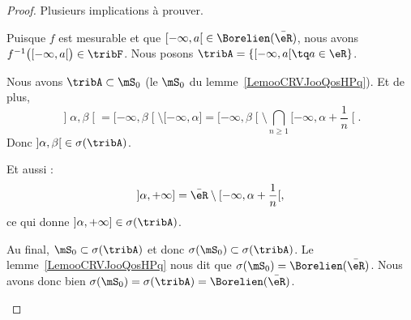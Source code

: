 \begin{proof}
	Plusieurs implications à prouver.
	\begin{subproof}
		\spitem[\ref{ITEMooHAMHooYLqUhVi}\( \Rightarrow\)\ref{ITEMooHAMHooYLqUhVii}]
		Puisque \( f\) est mesurable et que \( \mathopen[ -\infty , a \mathclose[\in\Borelien(\bar\eR)\), nous avons \( f^{-1}\big( \mathopen[ -\infty , a \mathclose[ \big)\in\tribF\).
		\spitem[\ref{ITEMooHAMHooYLqUhVii}\( \Rightarrow\)\ref{ITEMooHAMHooYLqUhVi}]
		Nous posons \( \tribA=\{ \mathopen[ -\infty , a \mathclose[\tq a\in \eR \}\).

				Nous avons \( \tribA\subset\mS_0\) (le \( \mS_0\) du lemme~\ref{LemooCRVJooQosHPq}). Et de plus,
				\begin{equation}
					\mathopen] \alpha , \beta \mathclose[=\mathopen[ -\infty , \beta \mathclose[\setminus\mathopen[ -\infty , \alpha \mathclose]=\mathopen[ -\infty , \beta \mathclose[\setminus\bigcap_{n\geq 1}\mathopen[ -\infty , \alpha+\frac{1}{ n } \mathclose[.
				\end{equation}
				Donc \( \mathopen] \alpha , \beta \mathclose[\in\sigma(\tribA)\).

				Et aussi :
				\begin{equation}
					\mathopen] \alpha , +\infty \mathclose]=\bar\eR\setminus\mathopen[ -\infty , \alpha+\frac{1}{ n } \mathclose[,
				\end{equation}
				ce qui donne \( \mathopen] \alpha , +\infty \mathclose]\in \sigma(\tribA)\).

		Au final, \( \mS_0\subset\sigma(\tribA)\) et donc \( \sigma(\mS_0)\subset\sigma(\tribA)\). Le lemme~\ref{LemooCRVJooQosHPq} nous dit que \( \sigma(\mS_0)=\Borelien(\bar \eR)\). Nous avons donc bien \( \sigma(\mS_0)=\sigma(\tribA)=\Borelien(\bar\eR)\).


\end{subproof}
\end{proof}

